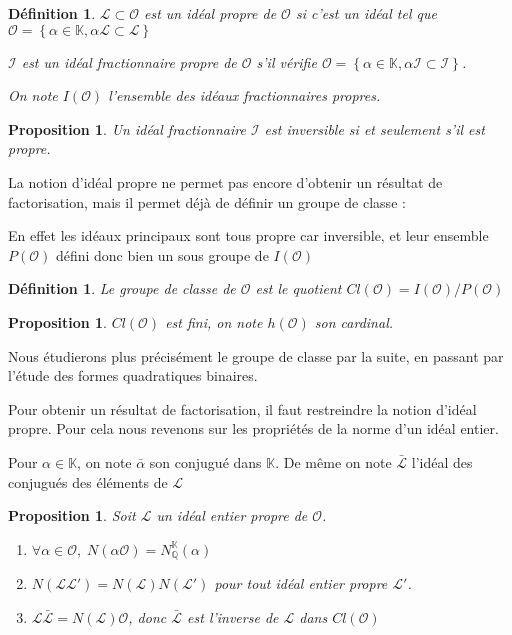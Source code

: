 \documentclass{article}
\newcommand{\Q}[0]{\mathbb{Q}}
\newcommand{\K}[0]{\mathbb{K}}
\newcommand{\OR}[0]{\mathcal{O}}
\newcommand{\LR}[0]{\mathcal{L}}
\newcommand{\IR}[0]{\mathcal{I}}
\newtheorem{Prop}[The]{Proposition}
\newtheorem{Def}[The]{Définition}
\begin{document}
\begin{Def}
	$\LR\subset\OR$ est un idéal propre de $\OR$ si c'est un idéal tel que $\OR = \left\lbrace \alpha\in\K, \alpha\LR\subset\LR\right\rbrace$
	
	$\IR$ est un idéal fractionnaire propre de $\OR$ s'il vérifie $\OR = \left\lbrace \alpha\in\K, \alpha\IR\subset\IR\right\rbrace$.
	
	On note $I(\OR)$ l'ensemble des idéaux fractionnaires propres.
\end{Def}

\begin{Prop}
	Un idéal fractionnaire $\IR$ est inversible si et seulement s'il est propre.
\end{Prop}

La notion d'idéal propre ne permet pas encore d'obtenir un résultat de factorisation, mais il permet déjà de définir un groupe de classe :

En effet les idéaux principaux sont tous propre car inversible, et leur ensemble $P(\OR)$ défini donc bien un sous groupe de $I(\OR)$

\begin{Def}
	Le groupe de classe de $\OR$ est le quotient $Cl(\OR) =  I(\OR)/P(\OR)$
\end{Def}

\begin{Prop}
	$Cl(\OR)$ est fini, on note $h(\OR)$ son cardinal. 
\end{Prop} 

Nous étudierons plus précisément le groupe de classe par la suite, en passant par l'étude des formes quadratiques binaires. 

Pour obtenir un résultat de factorisation, il faut restreindre la notion d'idéal propre. Pour cela nous revenons sur les propriétés de la norme d'un idéal entier.

Pour $\alpha\in\K$, on note $\bar{\alpha}$ son conjugué dans $\K$. De même on note $\bar{\LR}$ l'idéal des conjugués des éléments de $\LR$

\begin{Prop}
	Soit $\LR$ un idéal entier propre de $\OR$. 
	\begin{enumerate}
		\item $\forall\alpha\in\OR,\; N(\alpha\OR) = N_{\Q}^{\K}(\alpha)$
		\item $N(\LR\LR') = N(\LR)N(\LR')$ pour tout idéal entier propre $\LR'$.
		\item $\LR\bar{\LR} = N(\LR)\OR$, donc $\bar{\LR}$ est l'inverse de $\LR$ dans $Cl(\OR)$
	\end{enumerate}
\end{Prop}
\end{document}
